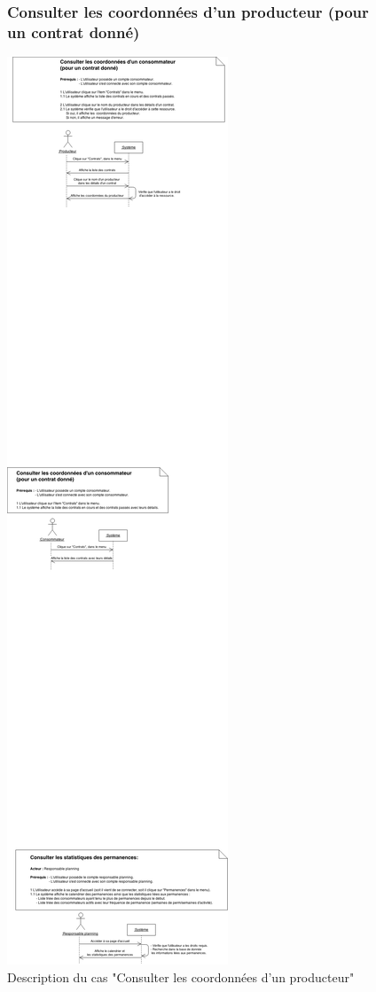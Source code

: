 \documentclass[12pt]{report}
\begin{document}
\begin{figure}[!h]
\centering
\subsubsection{Consulter les coordonnées d'un producteur (pour un contrat donné)~~~~~~~~~~~~~~~~~~~~~~~~~~~}
\includegraphics[width=1.\textwidth]{./ressources/desc_UC_coo_prod_contrats.png}
\caption{Description du cas "Consulter les coordonnées d'un producteur"}
\end{figure}
\clearpage
\end{document}
